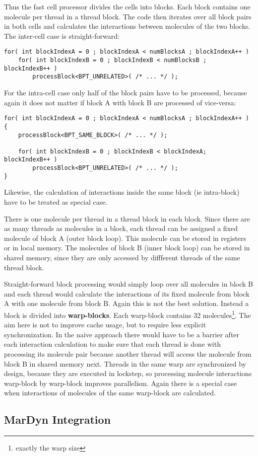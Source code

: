 Thus the fast cell processor divides the cells into blocks. Each block contains one molecule per thread in a thread block.
The code then iterates over all block pairs in both cells and calculates the interactions between molecules of the two blocks.
The inter-cell case is straight-forward:
\begin{lstlisting}[label=intercellloop,caption=Inter-Cell Block Processing]
for( int blockIndexA = 0 ; blockIndexA < numBlocksA ; blockIndexA++ )
	for( int blockIndexB = 0 ; blockIndexB < numBlocksB ; blockIndexB++ )
		processBlock<BPT_UNRELATED>( /* ... */ );

\end{lstlisting}
For the intra-cell case only half of the block pairs have to be processed, because again it does not matter if block A with block B are processed of vice-versa:
\begin{lstlisting}[label=intracellloop,caption=Intra-Cell Block Processing]
for( int blockIndexA = 0 ; blockIndexA < numBlocksA ; blockIndexA++ ) {
	processBlock<BPT_SAME_BLOCK>( /* ... */ );
	
	for( int blockIndexB = 0 ; blockIndexB < blockIndexA; blockIndexB++ )
		processBlock<BPT_UNRELATED>( /* ... */ );
}
\end{lstlisting}
Likewise, the calculation of interactions inside the same block (ie intra-block) have to be treated as special case.

There is one molecule per thread in a thread block in each block. Since there are as many threads as molecules in a block, each thread can be assigned a fixed molecule of block A (outer block loop). This molecule can be stored in registers or in local memory.
The molecules of block B (inner block loop) can be stored in shared memory, since they are only accessed by diffferent threads of the same thread block.

Straight-forward block processing would simply loop over all molecules in block B and each thread would calculate the interactions of its fixed molecule from block A with one molecule from block B.
Again this is not the best solution. Instead a block is divided into \textbf{warp-blocks}. Each warp-block contains 32 molecules\footnote{exactly the warp size}.
The aim here is not to improve cache usage, but to require less explicit synchronization.
In the naive approach there would have to be a barrier after each interaction calculation to make sure that each thread is done with processing its molecule pair because another thread will access the molecule from block B in shared memory next.
Threads in the same warp are synchronized by design, because they are executed in lockstep, so processing  molecule interactions warp-block by warp-block improves parallelism.
Again there is a special case when interactions of molecules of the same warp-block are calculated.


\subsection{MarDyn Integration}